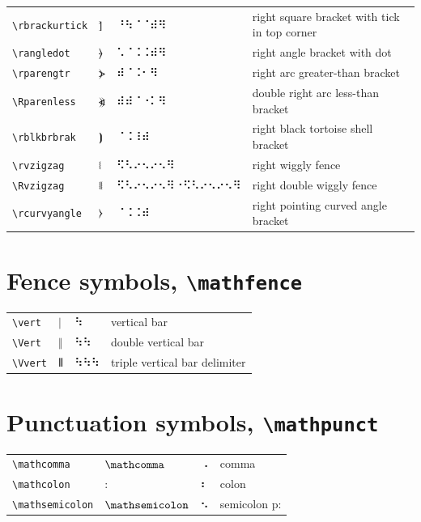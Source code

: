 \documentclass[oneside]{article}
\begin{document}
\begin{longtable}{llll}
\verb|\rbrackurtick| & $\rbrackurtick$ &  ⠘⠳⠈⠈⠾⠻  & {right square bracket with tick in top corner} \\[2ex]
\verb|\rangledot| & $\rangledot$ &  ⠡⠈⠨⠨⠾⠻  & {right angle bracket with dot} \\[2ex]
\verb|\rparengtr| & $\rparengtr$ &  ⠾⠈⠨⠂⠻  & {right arc greater-than bracket} \\[2ex]
\verb|\Rparenless| & $\Rparenless$ &  ⠾⠾⠈⠐⠅⠻  & {double right arc less-than bracket} \\[2ex]
\verb|\rblkbrbrak| & $\rblkbrbrak$ &  ⠈⠨⠸⠾  & {right black tortoise shell bracket} \\[2ex]
\verb|\rvzigzag| & $\rvzigzag$ &  ⠫⠣⠔⠢⠔⠢⠻  & {right wiggly fence} \\[2ex]
\verb|\Rvzigzag| & $\Rvzigzag$ &  ⠫⠣⠔⠢⠔⠢⠻⠐⠫⠣⠔⠢⠔⠢⠻  & {right double wiggly fence} \\[2ex]
\verb|\rcurvyangle| & $\rcurvyangle$ &  ⠈⠨⠨⠾  & {right pointing curved angle bracket} \\[2ex]
\end{longtable}


\clearpage

\section{Fence symbols,  \texttt{\textbackslash{}mathfence}}

\begin{longtable}{llll}
\verb|\vert| & $\vert$ &  ⠳  & {vertical bar} \\[2ex]
\verb|\Vert| & $\Vert$ &  ⠳⠳  & {double vertical bar} \\[2ex]
\verb|\Vvert| & $\Vvert$ &  ⠳⠳⠳  & {triple vertical bar delimiter} \\[2ex]
\end{longtable}

\section{Punctuation symbols, \texttt{\textbackslash{}mathpunct}}

\begin{longtable}{llll}
\verb|\mathcomma| & $\mathcomma$ &  ⠠  & {comma} \\[2ex]
\verb|\mathcolon| & $\mathcolon$ &  ⠆  & {colon} \\[2ex]
\verb|\mathsemicolon| & $\mathsemicolon$ &  ⠢  & {semicolon p:} \\[2ex]
\end{longtable}
\end{document}
